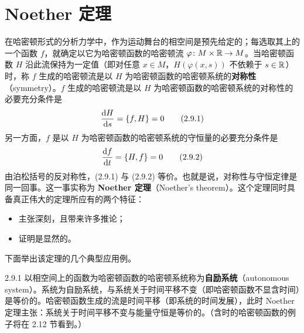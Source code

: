 

\section{Noether 定理}

在哈密顿形式的分析力学中，作为运动舞台的相空间是预先给定的；每选取其上的一个函数 $f$，就确定以它为哈密顿函数的哈密顿流 $\varphi\colon M\times\mathbb{R}\to M$。当哈密顿函数 $H$ 沿此流保持为一定值（即对任意 $x\in M$，$H(\varphi(x,s))$ 不依赖于 $s\in\mathbb{R}$）时，称 $f$ 生成的哈密顿流是以 $H$ 为哈密顿函数的哈密顿系统的\textbf{对称性}（symmetry）。$f$ 生成的哈密顿流是以 $H$ 为哈密顿函数的哈密顿系统的对称性的必要充分条件是
\begin{equation}
  \frac{\mathrm{d} H}{\mathrm{d} s} = \{f,H\} = 0
  \tag{2.9.1}
\end{equation}
另一方面，$f$ 是以 $H$ 为哈密顿函数的哈密顿系统的守恒量的必要充分条件是
\begin{equation}
  \frac{\mathrm{d} f}{\mathrm{d} t} = \{H,f\} = 0
  \tag{2.9.2}
\end{equation}
由泊松括号的反对称性，(2.9.1) 与 (2.9.2) 等价。也就是说，对称性与守恒定律是同一回事。这一事实称为 \textbf{Noether 定理}（Noether's theorem）。这个定理同时具备真正伟大的定理所应有的两个特征：
\begin{itemize}[leftmargin=2em]
  \item 主张深刻，且带来许多推论；
  \item 证明是显然的。
\end{itemize}
下面举出该定理的几个典型应用例。



\begin{example}{2.9.1}
以相空间上的函数为哈密顿函数的哈密顿系统称为\textbf{自励系统}（autonomous system）。系统为自励系统，与系统关于时间平移不变（即哈密顿函数不显含时间）是等价的。哈密顿函数生成的流是时间平移（即系统的时间发展），此时 Noether 定理主张：系统关于时间平移不变与能量守恒是等价的。（含时的哈密顿函数的例子将在 2.12 节看到。）
\end{example}

